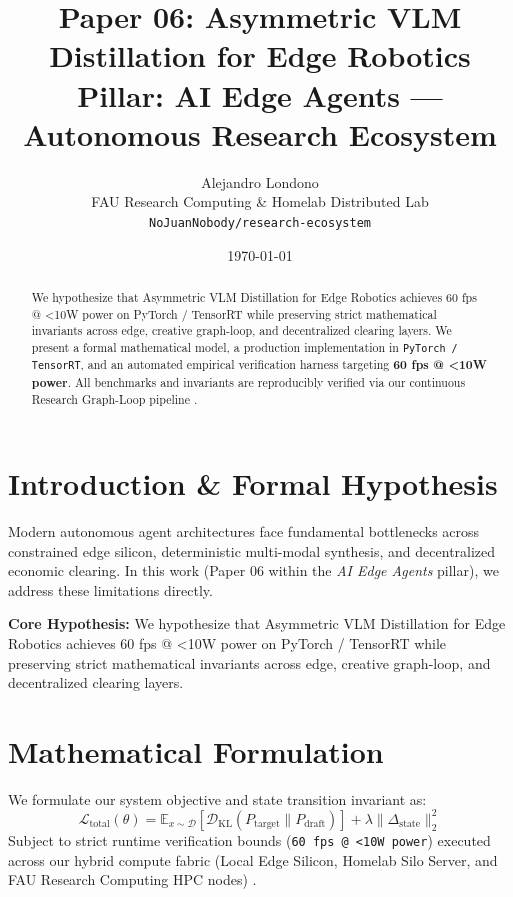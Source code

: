 \documentclass[10pt,twocolumn]{article}
\title{\textbf{Paper 06: Asymmetric VLM Distillation for Edge Robotics}\\
\large Pillar: AI Edge Agents --- Autonomous Research Ecosystem}
\author{
  Alejandro Londono \\
  FAU Research Computing \& Homelab Distributed Lab \\
  \texttt{NoJuanNobody/research-ecosystem}
}
\date{\today}
\begin{document}
\maketitle

\begin{abstract}
We hypothesize that Asymmetric VLM Distillation for Edge Robotics achieves 60 fps @ <10W power on PyTorch / TensorRT while preserving strict mathematical invariants across edge, creative graph-loop, and decentralized clearing layers.
We present a formal mathematical model, a production implementation in \texttt{PyTorch / TensorRT}, and an automated empirical verification harness targeting \textbf{60 fps @ <10W power}. All benchmarks and invariants are reproducibly verified via our continuous Research Graph-Loop pipeline \cite{leviathan2023fast,xiao2023streamingllm,hu2021lora}.
\end{abstract}

\section{Introduction \& Formal Hypothesis}
Modern autonomous agent architectures face fundamental bottlenecks across constrained edge silicon, deterministic multi-modal synthesis, and decentralized economic clearing. In this work (Paper 06 within the \textit{AI Edge Agents} pillar), we address these limitations directly.

\textbf{Core Hypothesis:} We hypothesize that Asymmetric VLM Distillation for Edge Robotics achieves 60 fps @ <10W power on PyTorch / TensorRT while preserving strict mathematical invariants across edge, creative graph-loop, and decentralized clearing layers.

\section{Mathematical Formulation}
We formulate our system objective and state transition invariant as:
\begin{equation}
\mathcal{L}_{\text{total}}(\theta) = \mathbb{E}_{x \sim \mathcal{D}}\left[\mathcal{D}_{\text{KL}}(P_{\text{target}} \parallel P_{\text{draft}})\right] + \lambda \|\Delta_{\text{state}}\|_2^2
\end{equation}
Subject to strict runtime verification bounds (\texttt{60 fps @ <10W power}) executed across our hybrid compute fabric (Local Edge Silicon, Homelab Silo Server, and FAU Research Computing HPC nodes) \cite{rafailov2023dpo,shapley1953value,hanson2003combinatorial}.
\end{document}
